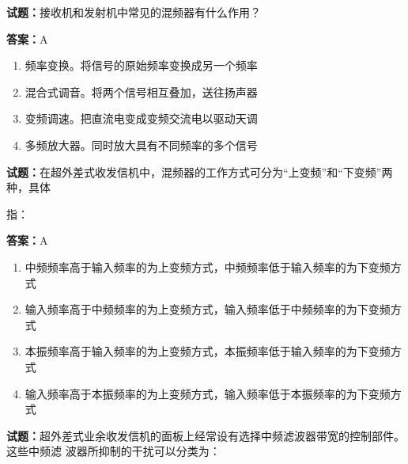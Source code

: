 \documentclass{ctexbook}
\begin{document}
\vspace{1em}

\textbf{试题：}接收机和发射机中常见的混频器有什么作用？ 

\textbf{答案：}A 

\begin{enumerate}[leftmargin=3em]
  \item 频率变换。将信号的原始频率变换成另一个频率 

  \item 混合式调音。将两个信号相互叠加，送往扬声器 

  \item 变频调速。把直流电变成变频交流电以驱动天调 

  \item 多频放大器。同时放大具有不同频率的多个信号 

\end{enumerate}





\vspace{1em}

\textbf{试题：}在超外差式收发信机中，混频器的工作方式可分为“上变频”和“下变频”两种，具体


指： 

\textbf{答案：}A 

\begin{enumerate}[leftmargin=3em]
  \item 中频频率高于输入频率的为上变频方式，中频频率低于输入频率的为下变频方式 

  \item 输入频率高于中频频率的为上变频方式，输入频率低于中频频率的为下变频方式 

  \item 本振频率高于输入频率的为上变频方式，本振频率低于输入频率的为下变频方式 

  \item 输入频率高于本振频率的为上变频方式，输入频率低于本振频率的为下变频方式 

\end{enumerate}





\vspace{1em}

\textbf{试题：}超外差式业余收发信机的面板上经常设有选择中频滤波器带宽的控制部件。这些中频滤
波器所抑制的干扰可以分类为： 
\end{document}
